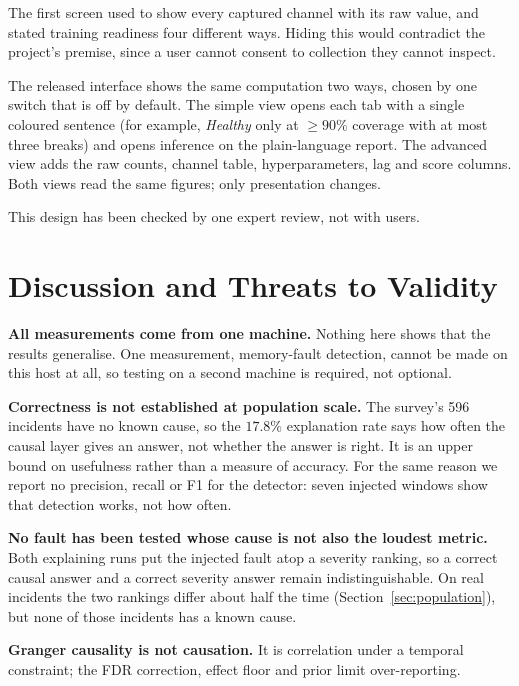 \documentclass[conference,a4paper]{IEEEtran}
\begin{document}
The first screen used to show every captured channel with its raw value, and
stated training readiness four different ways. Hiding this would contradict
the project's premise, since a user cannot consent to collection they cannot
inspect.

The released interface shows the same computation two ways, chosen by one
switch that is off by default. The simple view opens each tab with a single
coloured sentence (for example, \emph{Healthy} only at $\ge 90\%$ coverage
with at most three breaks) and opens inference on the plain-language report.
The advanced view adds the raw counts, channel table, hyperparameters, lag
and score columns. Both views read the same figures; only presentation
changes.

This design has been checked by one expert review, not with users.

\section{Discussion and Threats to Validity}

\textbf{All measurements come from one machine.} Nothing here shows that the
results generalise. One measurement, memory-fault detection, cannot be made on
this host at all, so testing on a second machine is required, not optional.

\textbf{Correctness is not established at population scale.} The survey's 596
incidents have no known cause, so the $17.8\%$ explanation rate says how often
the causal layer gives an answer, not whether the answer is right. It is an
upper bound on usefulness rather than a measure of accuracy. For the same
reason we report no precision, recall or F1 for the detector: seven injected
windows show that detection works, not how often.

\textbf{No fault has been tested whose cause is not also the loudest metric.}
Both explaining runs put the injected fault atop a severity ranking, so a
correct causal answer and a correct severity answer remain indistinguishable.
On real incidents the two rankings differ about half the time
(Section~\ref{sec:population}), but none of those incidents has a known
cause.

\textbf{Granger causality is not causation.} It is correlation under a temporal
constraint; the FDR correction, effect floor and prior limit over-reporting.
\end{document}
